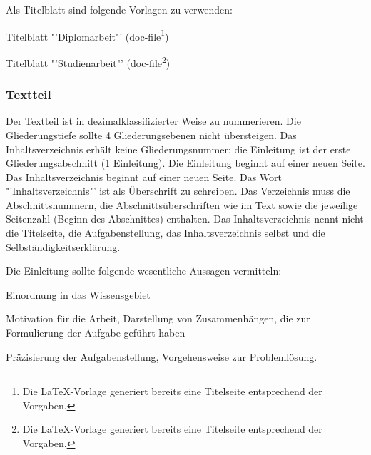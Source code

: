 Als Titelblatt sind folgende Vorlagen zu verwenden:

\begin{compactitem}
  \item Titelblatt "'Diplomarbeit"' (\href{http://www.et.tu-dresden.de/ifa/fileadmin/user_upload/www_files/richtlinien_sa_da/DA-Deckblatt_IfA.doc}{doc-file}\footnote{Die LaTeX-Vorlage generiert bereits eine Titelseite entsprechend der Vorgaben.})
    \item Titelblatt "'Studienarbeit"' (\href{http://www.et.tu-dresden.de/ifa/fileadmin/user_upload/www_files/richtlinien_sa_da/SA-Deckblatt_IfA.doc}{doc-file}\footnote{Die LaTeX-Vorlage generiert bereits eine Titelseite entsprechend der Vorgaben.})
\end{compactitem}


\subsubsection{Textteil}
\label{sec:Textteil}

Der Textteil ist in dezimalklassifizierter Weise zu nummerieren. Die Gliederungstiefe sollte 4 Gliederungsebenen nicht übersteigen. Das Inhaltsverzeichnis erhält keine Gliederungsnummer; die Einleitung ist der erste Gliederungsabschnitt (1 Einleitung). Die Einleitung beginnt auf einer neuen Seite.
Das Inhaltsverzeichnis beginnt auf einer neuen Seite. Das Wort "'Inhaltsverzeichnis"' ist als Überschrift zu schreiben. Das Verzeichnis muss die Abschnittsnummern, die Abschnittsüberschriften wie im Text sowie die jeweilige Seitenzahl (Beginn des Abschnittes) enthalten.
Das Inhaltsverzeichnis nennt nicht die Titelseite, die Aufgabenstellung, das Inhaltsverzeichnis selbst und die Selbständigkeitserklärung.

Die Einleitung sollte folgende wesentliche Aussagen vermitteln:
\begin{compactitem}
  \item Einordnung in das Wissensgebiet
  \item Motivation für die Arbeit, Darstellung von Zusammenhängen, die zur Formulierung der Aufgabe geführt haben
  \item Präzisierung der Aufgabenstellung, Vorgehensweise zur Problemlösung.
\end{compactitem}

